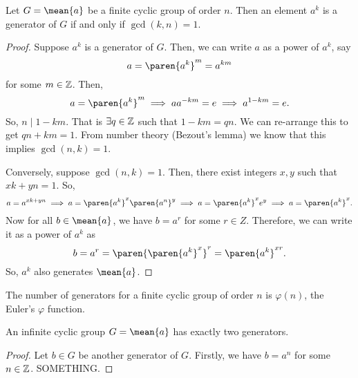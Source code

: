\documentclass[11pt]{penrose}
\newcommand{\cyclic}[1]{\mean{#1}}
\begin{document}
\begin{nthm}
    Let $G = \cyclic{a}$ be a finite cyclic group of order $n$. Then an element $a^k$ is a generator of $G$ if and only if $\gcd(k,n) = 1$.
\end{nthm}
\begin{proof}
    Suppose $a^k$ is a generator of $G$. Then, we can write $a$ as a power of $a^k$, say
    \begin{equation*}
        a = \paren{a^k}^m = a^{km}
    \end{equation*}
    for some $m \in \mathbb{Z}$. Then,
    \begin{equation*}
        a = \paren{a^k}^m
        \implies
        a a^{-km} = e
        \implies
        a^{1-km} = e.
    \end{equation*}
    So, $n \mid 1 - km$. That is $\exists q \in \mathbb{Z}$ such that $1 - km = qn$. We can re-arrange this to get $qn + km = 1$. From number theory (Bezout's lemma) we know that this implies $\gcd(n,k)=1$.

    Conversely, suppose $\gcd(n,k)=1$. Then, there exist integers $x, y$ such that $xk + yn = 1$. So,
    \begin{equation*}
        a = a^{xk + yn}
        \implies
        a = \paren{a^{k}}^{x} \paren{a^{n}}^{y}
        \implies
        a = \paren{a^{k}}^{x} e^{y}
        \implies
        a = \paren{a^{k}}^{x}.
    \end{equation*}
    Now for all $b \in \cyclic{a}$, we have $b = a^r$ for some $r \in Z$. Therefore, we can write it as a power of $a^k$ as
    \begin{equation*}
        b = a^r = \paren{\paren{a^{k}}^{x}}^{r} = \paren{a^{k}}^{xr}.
    \end{equation*}
    So, $a^k$ also generates $\cyclic{a}$.
\end{proof}

\begin{remark}
    The number of generators for a finite cyclic group of order $n$ is $\varphi(n)$, the Euler's $\varphi$ function.
\end{remark}

\begin{nthm}
    An infinite cyclic group $G = \cyclic{a}$ has exactly two generators.
\end{nthm}
\begin{proof}
    Let $b \in G$ be another generator of $G$. Firstly, we have $b = a^n$ for some $n \in \mathbb{Z}$. SOMETHING.
\end{proof}
\end{document}
